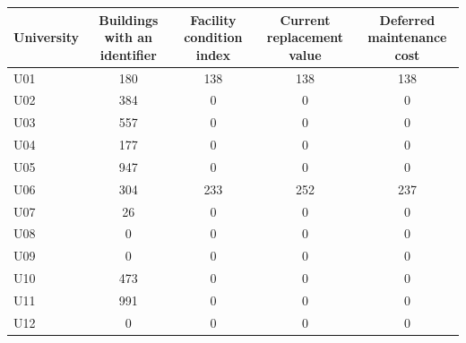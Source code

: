 \begin{tabular}{lcccc}
\toprule
University & Buildings with an identifier & Facility condition index & Current replacement value & Deferred maintenance cost \\
\midrule
U01 & 180 & 138 & 138 & 138 \\
U02 & 384 & 0 & 0 & 0 \\
U03 & 557 & 0 & 0 & 0 \\
U04 & 177 & 0 & 0 & 0 \\
U05 & 947 & 0 & 0 & 0 \\
U06 & 304 & 233 & 252 & 237 \\
U07 & 26 & 0 & 0 & 0 \\
U08 & 0 & 0 & 0 & 0 \\
U09 & 0 & 0 & 0 & 0 \\
U10 & 473 & 0 & 0 & 0 \\
U11 & 991 & 0 & 0 & 0 \\
U12 & 0 & 0 & 0 & 0 \\
\bottomrule
\end{tabular}
